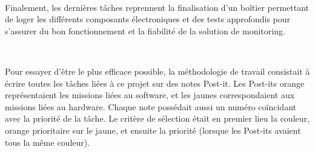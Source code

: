 ~

\noindent
Finalement, les dernières tâches reprennent la finalisation d’un boîtier permettant de loger les différents composants électroniques et des tests approfondis pour s’assurer du bon fonctionnement et la fiabilité de la solution de monitoring.

~

\noindent
Pour essayer d’être le plus efficace possible, la méthodologie de travail consistait à écrire toutes les tâches liées à ce projet sur des notes Post-it. Les Post-its orange représentaient les missions liées au software, et les jaunes correspondaient aux missions liées au hardware. Chaque note possédait aussi un numéro coïncidant avec la priorité de la tâche. Le critère de sélection était en premier lieu la couleur, orange prioritaire sur le jaune, et ensuite la priorité (lorsque les Post-its avaient tous la même couleur).
